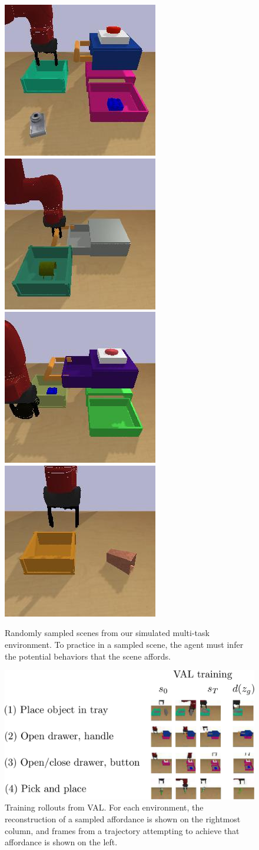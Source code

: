\begin{figure}[t]
    \center
    \includegraphics[height=0.24\linewidth]{val/imgs/views/simb_view.jpeg}
    \includegraphics[width=0.24\linewidth]{val/imgs/views/sima_view1.jpeg}
    \includegraphics[height=0.24\linewidth]{val/imgs/views/sima_view2.jpeg}
    \includegraphics[width=0.24\linewidth]{val/imgs/views/sima_view3.jpeg}
    \caption{Randomly sampled scenes from our simulated multi-task environment. To practice in a sampled scene, the agent must infer the potential behaviors that the scene affords.}
    \label{fig:simenvs}
\end{figure}

\begin{figure}[t]
    \center
    \includegraphics[width=0.6\linewidth]{val/imgs/fig_rollouts_sim-crop-compressed.pdf}
    \caption{Training rollouts from VAL. For each environment, the reconstruction of a sampled affordance is shown on the rightmost column, and frames from a trajectory attempting to achieve that affordance is shown on the left.}
    \label{fig:simenvs}
\end{figure}

